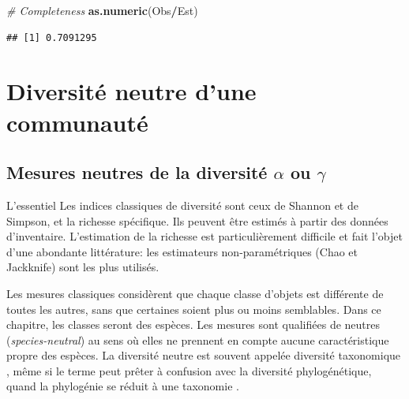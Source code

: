 \documentclass[
  11pt,
  french,
  a4paper,
  extrafontsizes,onecolumn,openright
  ]{memoir}
\newenvironment{Shaded}{\begin{snugshade}}{\end{snugshade}}
\newcommand{\CommentTok}[1]{\textcolor[rgb]{0.56,0.35,0.01}{\textit{#1}}}
\newcommand{\KeywordTok}[1]{\textcolor[rgb]{0.13,0.29,0.53}{\textbf{#1}}}
\newcommand{\NormalTok}[1]{#1}
\newcommand{\OperatorTok}[1]{\textcolor[rgb]{0.81,0.36,0.00}{\textbf{#1}}}
\newenvironment{Essentiel}
  {\begin{bclogo}[logo=\bctrombone, noborder=true, couleur=lightgray!50]{L'essentiel}\parindent0pt}
  {\end{bclogo}}
\begin{document}
\begin{Shaded}
\begin{Highlighting}[]
\CommentTok{# Completeness}
\KeywordTok{as.numeric}\NormalTok{(Obs}\OperatorTok{/}\NormalTok{Est)}
\end{Highlighting}
\end{Shaded}

\begin{verbatim}
## [1] 0.7091295
\end{verbatim}

\normalsize

\hypertarget{part-diversituxe9-neutre-dune-communautuxe9}{%
\part{Diversité neutre d'une communauté}\label{part-diversituxe9-neutre-dune-communautuxe9}}

\hypertarget{chap:MesuresNeutres}{%
\chapter{\texorpdfstring{Mesures neutres de la diversité \(\alpha\) ou \(\gamma\)}{Mesures neutres de la diversité \textbackslash alpha ou \textbackslash gamma}}\label{chap:MesuresNeutres}}

\scriptsize

\normalsize

\scriptsize

\begin{Essentiel}
Les indices classiques de diversité sont ceux de Shannon et de Simpson,
et la richesse spécifique. Ils peuvent être estimés à partir des données
d'inventaire. L'estimation de la richesse est particulièrement difficile
et fait l'objet d'une abondante littérature: les estimateurs
non-paramétriques (Chao et Jackknife) sont les plus utilisés.
\end{Essentiel}

\normalsize

Les mesures classiques \autocite{Peet1974} considèrent que chaque classe d'objets est différente de toutes les autres, sans que certaines soient plus ou moins semblables.
Dans ce chapitre, les classes seront des espèces.
Les mesures sont qualifiées de neutres (\emph{species-neutral}) au sens où elles ne prennent en compte aucune caractéristique propre des espèces.
La diversité neutre est souvent appelée diversité taxonomique \autocite{Devictor2010,Stegen2011}, même si le terme peut prêter à confusion avec la diversité phylogénétique, quand la phylogénie se réduit à une taxonomie \autocite{Clarke2001,Ricotta2003c}.
\end{document}
